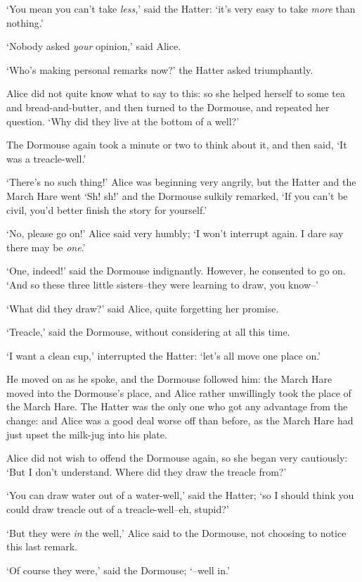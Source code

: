   `You mean you can't take {\it less},' said the Hatter:  `it's very
easy to take {\it more} than nothing.'

  `Nobody asked {\it your} opinion,' said Alice.

  `Who's making personal remarks now?' the Hatter asked
triumphantly.

  Alice did not quite know what to say to this:  so she helped
herself to some tea and bread-and-butter, and then turned to the
Dormouse, and repeated her question.  `Why did they live at the
bottom of a well?'

  The Dormouse again took a minute or two to think about it, and
then said, `It was a treacle-well.'

  `There's no such thing!'  Alice was beginning very angrily, but
the Hatter and the March Hare went `Sh! sh!' and the Dormouse
sulkily remarked, `If you can't be civil, you'd better finish the
story for yourself.'

  `No, please go on!' Alice said very humbly; `I won't interrupt
again.  I dare say there may be {\it one}.'

  `One, indeed!' said the Dormouse indignantly.  However, he
consented to go on.  `And so these three little sisters--they
were learning to draw, you know--'

  `What did they draw?' said Alice, quite forgetting her promise.

  `Treacle,' said the Dormouse, without considering at all this
time.

  `I want a clean cup,' interrupted the Hatter:  `let's all move
one place on.'

  He moved on as he spoke, and the Dormouse followed him:  the
March Hare moved into the Dormouse's place, and Alice rather
unwillingly took the place of the March Hare.  The Hatter was the
only one who got any advantage from the change:  and Alice was a
good deal worse off than before, as the March Hare had just upset
the milk-jug into his plate.

  Alice did not wish to offend the Dormouse again, so she began
very cautiously:  `But I don't understand.  Where did they draw
the treacle from?'

  `You can draw water out of a water-well,' said the Hatter; `so
I should think you could draw treacle out of a treacle-well--eh,
stupid?'

  `But they were {\it in} the well,' Alice said to the Dormouse, not
choosing to notice this last remark.

  `Of course they were,' said the Dormouse; `--well in.'

